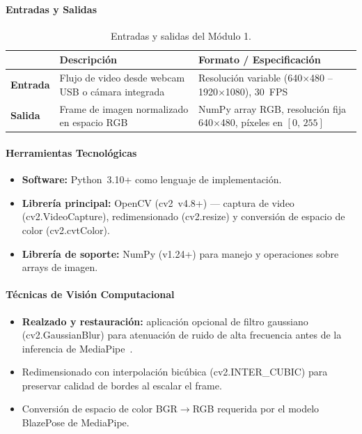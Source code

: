 \paragraph{Entradas y Salidas}

\begin{table}[h!]
\centering
\renewcommand{\arraystretch}{1.3}
\begin{tabularx}{\textwidth}{
    >{\bfseries}p{3cm}
    X
    X
}    
\toprule
&
\textbf{Descripción} &
\textbf{Formato / Especificación} \\
\midrule
Entrada &
  Flujo de video desde webcam USB o cámara integrada &
  Resolución variable (640$\times$480 -- 1920$\times$1080), 30~FPS \\
\midrule
Salida &
  Frame de imagen normalizado en espacio RGB &
  NumPy array RGB, resolución fija 640$\times$480, píxeles en $[0,\,255]$ \\
\bottomrule
\end{tabularx}
\caption{Entradas y salidas del Módulo 1.}
\label{tab:m1_io}
\end{table}

\paragraph{Herramientas Tecnológicas}
\begin{itemize}[leftmargin=1.5em]
  \item \textbf{Software:} Python~3.10+ como lenguaje de implementación.
  \item \textbf{Librería principal:} OpenCV (cv2~v4.8+) \cite{Bradski2000}
        — captura de video (cv2.VideoCapture), redimensionado
        (cv2.resize) y conversión de espacio de color
        (cv2.cvtColor).
  \item \textbf{Librería de soporte:} NumPy (v1.24+) para manejo
        y operaciones sobre arrays de imagen.
\end{itemize}

\paragraph{Técnicas de Visión Computacional}
\begin{itemize}[leftmargin=1.5em]
  \item \textbf{Realzado y restauración:} aplicación opcional de filtro
        gaussiano (cv2.GaussianBlur) para atenuación de ruido
        de alta frecuencia antes de la inferencia de
        MediaPipe~\cite{GonzalezWoods2018}.
  \item Redimensionado con interpolación bicúbica
        (cv2.INTER\_CUBIC) para preservar calidad de bordes
        al escalar el frame.
  \item Conversión de espacio de color BGR$\to$RGB requerida por el
        modelo BlazePose de MediaPipe.
\end{itemize}

